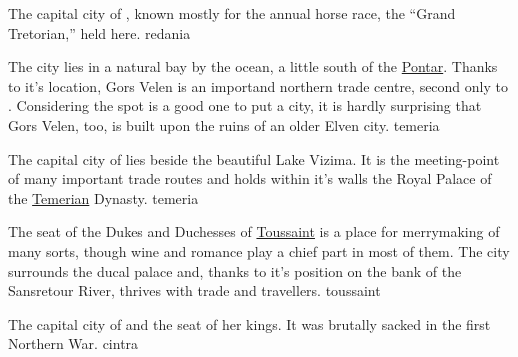 {
    The capital city of , known mostly for the annual horse race, the ``Grand Tretorian,'' held here.
}
{redania}

{
    The city lies in a natural bay by the ocean, a little south of the \hyperref[region:pontar]{Pontar}. Thanks to it's location,
    Gors Velen is an importand northern trade centre, second only to . Considering the spot is a good one
    to put a city, it is hardly surprising that Gors Velen, too, is built upon the ruins of an older Elven city.
}
{temeria}

{
    The capital city of  lies beside the beautiful Lake Vizima. It is the meeting-point of many
    important trade routes and holds within it's walls the Royal Palace of the \hyperref[realm:temeria]{Temerian} Dynasty.
}
{temeria}

{
    The seat of the Dukes and Duchesses of \hyperref[realm:toussaint]{Toussaint} is a place for merrymaking of many sorts,
    though wine and romance play a chief part in most of them. The city surrounds the ducal palace and, thanks to it's
    position on the bank of the Sansretour River, thrives with trade and travellers.
}
{toussaint}

{
    The capital city of  and the seat of her kings. It was brutally sacked in the first Northern War.
}
{cintra}